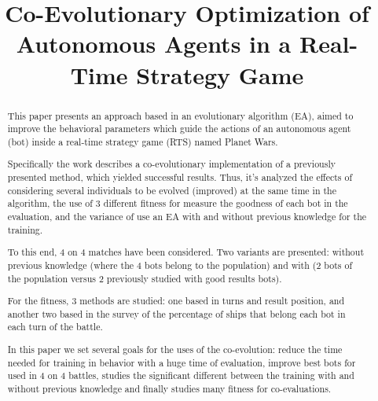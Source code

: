 \documentclass{llncs}
\begin{document}

\title{Co-Evolutionary Optimization of Autonomous Agents in a Real-Time Strategy Game}




%

\maketitle

%
%
\begin{abstract}
This paper presents an approach based in an evolutionary algorithm
(EA), aimed to improve the behavioral parameters which guide the
actions of an autonomous agent (bot) inside a real-time strategy game
(RTS) named Planet Wars. 

Specifically the work describes a co-evolutionary implementation of a
previously presented method, which yielded successful results.
Thus, it's analyzed the effects of considering several individuals
to be evolved (improved) at the same time in the algorithm,
the use of 3 different fitness for measure the goodness of each bot in the evaluation,
and the variance of use an EA with and without previous knowledge for the training.

To this end, 4 on 4 matches have been considered. Two variants are presented:
without previous knowledge (where the 4 bots belong to the population) and with
(2 bots of the population versus 2 previously studied with good results bots).

For the fitness, 3 methods are studied: one based in turns and result position,
and another two based in the survey of the percentage of ships that belong each bot in each turn of the battle.

In this paper we set several goals for the uses of the co-evolution:
reduce the time needed for training in behavior with a huge time of evaluation,
improve best bots for used in 4 on 4 battles,
studies the significant different between the training with and without previous knowledge
and finally studies many fitness for co-evaluations.

\end{abstract}
\end{document}
